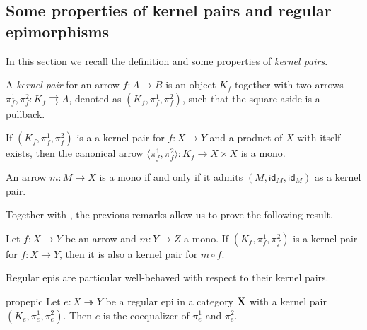 \documentclass[3p]{elsarticle}
\def\X{\textbf {\textup{X}}}
\newcommand{\eto}{\twoheadrightarrow}
\newcommand{\id}[1]{\mathsf{id}_{#1}}
\theoremstyle{remark}
\theoremstyle{definition}
\begin{document}
\subsection{Some properties of kernel pairs and regular epimorphisms}

In this section we recall the definition and some properties of \emph{kernel pairs}.

\noindent 
\begin{minipage}[l]{.85\linewidth}
\begin{defi} A \emph{kernel pair} for an arrow $f\colon A \to B$ is an object $K_f$ together with two arrows $\pi^1_f, \pi^2_f\colon K_f \rightrightarrows A$, denoted as $(K_f, \pi^1_f, \pi^2_f)$, such that the square aside is a pullback.
\end{defi}
\end{minipage} \hfill 
\begin{minipage}[r]{.18\linewidth}
\end{minipage} 

\begin{rem}\label{prop:pairng_of_kernel_pairs_mono}
If $(K_f, \pi^1_f, \pi^2_f)$ is a a kernel pair for $f\colon X \to Y$ and a product of $X$ with itself exists, then the canonical arrow $\langle \pi^1_f, \pi^2_f\rangle \colon K_f \to X \times X$ is a mono.
\end{rem}

\begin{rem}\label{prop:kermono}
An arrow $m\colon M\to X$ is a mono if and only if it admits $(M, \id{M}, \id{M})$ as a kernel pair.
\end{rem}

Together with , the previous remarks allow us to prove the following result.

\begin{prop}\label{cor:kermono}
	Let $f\colon X\to Y$ be an arrow and $m\colon Y\to Z$ a mono. If
	$(K_f, \pi_f^1, \pi_f^2)$ is a kernel pair for $f\colon X\to Y$, then it is also a kernel pair for $m\circ f$.
\end{prop}

Regular epis are particular well-behaved with respect to their kernel pairs.

\begin{restatable}{prop}{epic}\label{prop:reg_epi_coeq}
    Let $e\colon X \eto Y$ be a regular epi in a category $\X$ with a kernel pair $(K_e, \pi^1_e, \pi^2_e)$. Then $e$ is the coequalizer of $\pi^1_e$ and $\pi^2_e$.
\end{restatable}
\end{document}
